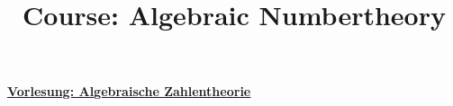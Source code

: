 



\usepackage{transparent}
\newenvironment{donotshow}{
	\begin{minipage}[t][0cm]{0cm}
	\renewcommand{\newpage}{ }
	\transparent{0}}
	{\end{minipage}}



\pagestyle{fancy}


\chead{}

\title{Course: Algebraic Numbertheory}
\begin{huge}
\underline{\underline{\textbf{Vorlesung: Algebraische Zahlentheorie}}}
\end{huge}







%





